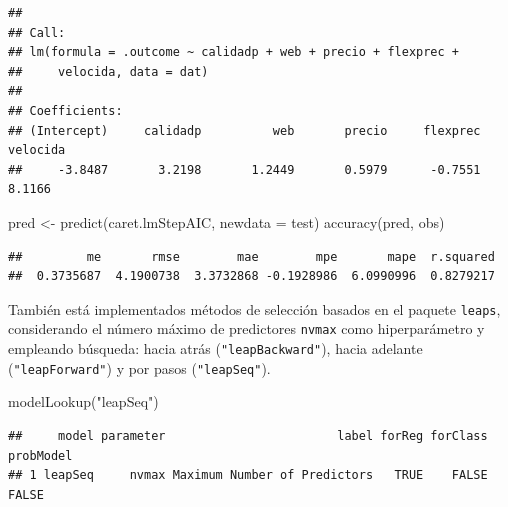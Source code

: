\documentclass[
  spanish,
]{book}
\newenvironment{Shaded}{\begin{snugshade}}{\end{snugshade}}
\newcommand{\AttributeTok}[1]{\textcolor[rgb]{0.77,0.63,0.00}{#1}}
\newcommand{\FunctionTok}[1]{\textcolor[rgb]{0.00,0.00,0.00}{#1}}
\newcommand{\NormalTok}[1]{#1}
\newcommand{\OtherTok}[1]{\textcolor[rgb]{0.56,0.35,0.01}{#1}}
\newcommand{\SpecialCharTok}[1]{\textcolor[rgb]{0.00,0.00,0.00}{#1}}
\newcommand{\StringTok}[1]{\textcolor[rgb]{0.31,0.60,0.02}{#1}}
\theoremstyle{break}
\theoremstyle{definition}
\theoremstyle{definition}
\theoremstyle{definition}
\theoremstyle{definition}
\theoremstyle{remark}
\begin{document}
\begin{Shaded}
\end{Shaded}

\begin{verbatim}
## 
## Call:
## lm(formula = .outcome ~ calidadp + web + precio + flexprec + 
##     velocida, data = dat)
## 
## Coefficients:
## (Intercept)     calidadp          web       precio     flexprec     velocida  
##     -3.8487       3.2198       1.2449       0.5979      -0.7551       8.1166
\end{verbatim}

\begin{Shaded}
\begin{Highlighting}[]
\NormalTok{pred }\OtherTok{\textless{}{-}} \FunctionTok{predict}\NormalTok{(caret.lmStepAIC, }\AttributeTok{newdata =}\NormalTok{ test)}
\FunctionTok{accuracy}\NormalTok{(pred, obs)}
\end{Highlighting}
\end{Shaded}

\begin{verbatim}
##         me       rmse        mae        mpe       mape  r.squared 
##  0.3735687  4.1900738  3.3732868 -0.1928986  6.0990996  0.8279217
\end{verbatim}

También está implementados métodos de selección basados en el paquete \texttt{leaps}, considerando el número máximo de predictores \texttt{nvmax} como hiperparámetro y empleando búsqueda: hacia atrás (\texttt{"leapBackward"}), hacia adelante (\texttt{"leapForward"}) y por pasos (\texttt{"leapSeq"}).

\begin{Shaded}
\begin{Highlighting}[]
\FunctionTok{modelLookup}\NormalTok{(}\StringTok{"leapSeq"}\NormalTok{)}
\end{Highlighting}
\end{Shaded}

\begin{verbatim}
##     model parameter                        label forReg forClass probModel
## 1 leapSeq     nvmax Maximum Number of Predictors   TRUE    FALSE     FALSE
\end{verbatim}
\end{document}
